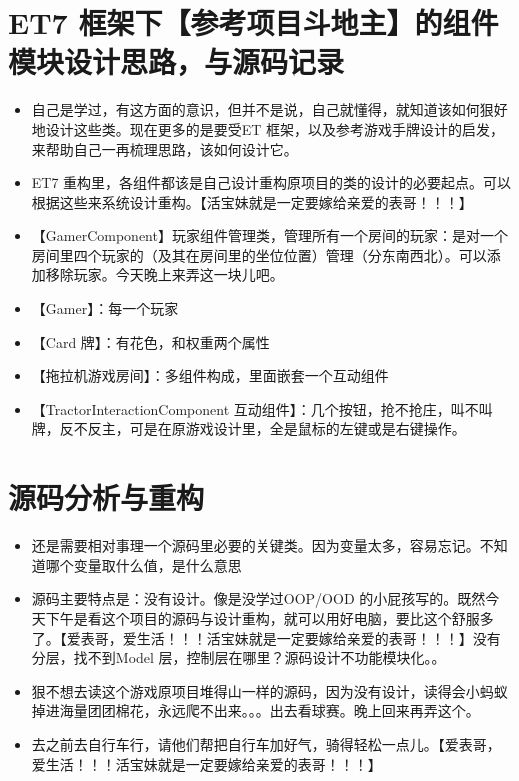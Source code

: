 \documentclass[9pt, b5paper]{article}
\begin{document}
\subsection{}
\label{sec-3-7}
\section{ET7 框架下【参考项目斗地主】的组件模块设计思路，与源码记录}
\label{sec-4}
\begin{itemize}
\item 自己是学过，有这方面的意识，但并不是说，自己就懂得，就知道该如何狠好地设计这些类。现在更多的是要受ET 框架，以及参考游戏手牌设计的启发，来帮助自己一再梳理思路，该如何设计它。
\item ET7 重构里，各组件都该是自己设计重构原项目的类的设计的必要起点。可以根据这些来系统设计重构。【活宝妹就是一定要嫁给亲爱的表哥！！！】
\item 【GamerComponent】玩家组件管理类，管理所有一个房间的玩家：是对一个房间里四个玩家的（及其在房间里的坐位位置）管理（分东南西北）。可以添加移除玩家。今天晚上来弄这一块儿吧。
\item 【Gamer】：每一个玩家
\item 【Card 牌】：有花色，和权重两个属性
\item 【拖拉机游戏房间】：多组件构成，里面嵌套一个互动组件
\item 【TractorInteractionComponent 互动组件】：几个按钮，抢不抢庄，叫不叫牌，反不反主，可是在原游戏设计里，全是鼠标的左键或是右键操作。
\end{itemize}
\section{源码分析与重构}
\label{sec-5}
\begin{itemize}
\item 还是需要相对事理一个源码里必要的关键类。因为变量太多，容易忘记。不知道哪个变量取什么值，是什么意思
\item 源码主要特点是：没有设计。像是没学过OOP/OOD 的小屁孩写的。既然今天下午是看这个项目的源码与设计重构，就可以用好电脑，要比这个舒服多了。【爱表哥，爱生活！！！活宝妹就是一定要嫁给亲爱的表哥！！！】没有分层，找不到Model 层，控制层在哪里？源码设计不功能模块化。。
\item 狠不想去读这个游戏原项目堆得山一样的源码，因为没有设计，读得会小蚂蚁掉进海量团团棉花，永远爬不出来。。。出去看球赛。晚上回来再弄这个。
\item 去之前去自行车行，请他们帮把自行车加好气，骑得轻松一点儿。【爱表哥，爱生活！！！活宝妹就是一定要嫁给亲爱的表哥！！！】
\end{itemize}
\end{document}
